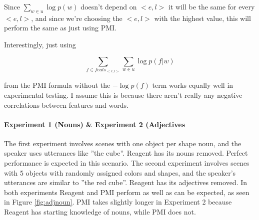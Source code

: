 \documentclass[12pt]{article}
\begin{document}
Since $\sum_{w\in u}\log{p(w)}$ doesn't depend on $<e,l>$ it will be the same for every $<e,l>$, and since we're choosing the $<e,l>$ with the highest value, this will perform the same as just using PMI.

Interestingly, just using

\[\sum_{f \in feats_{<e,l>}}\sum_{w\in u}\log{p(f|w)}\]

from the PMI formula without the $-\log{p(f)}$ term works equally well in experimental testing. I assume this is because there aren't really any negative correlations between features and words.

\paragraph{Experiment 1 (Nouns) \& Experiment 2 (Adjectives} 
The first experiment involves scenes with one object per shape noun, and the speaker uses utterances like ''the cube''. Reagent has its nouns removed. Perfect performance is expected in this scenario. The second experiment involves scenes with 5 objects with randomly assigned colors and shapes, and the speaker's utterances are similar to ''the red cube''. Reagent has its adjectives removed. In both experiments Reagent and PMI perform as well as can be expected, as seen in Figure \ref{fig:adjnoun}. PMI takes slightly longer in Experiment 2 because Reagent has starting knowledge of nouns, while PMI does not.
\end{document}
